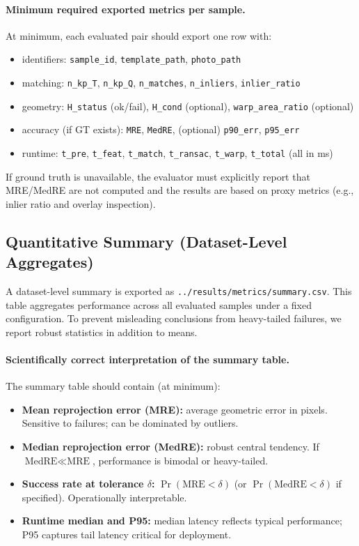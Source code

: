 \paragraph{Minimum required exported metrics per sample.}
At minimum, each evaluated pair should export one row with:
\begin{itemize}
  \item identifiers: \texttt{sample\_id}, \texttt{template\_path}, \texttt{photo\_path}
  \item matching: \texttt{n\_kp\_T}, \texttt{n\_kp\_Q}, \texttt{n\_matches}, \texttt{n\_inliers}, \texttt{inlier\_ratio}
  \item geometry: \texttt{H\_status} (ok/fail), \texttt{H\_cond} (optional), \texttt{warp\_area\_ratio} (optional)
  \item accuracy (if GT exists): \texttt{MRE}, \texttt{MedRE}, (optional) \texttt{p90\_err}, \texttt{p95\_err}
  \item runtime: \texttt{t\_pre}, \texttt{t\_feat}, \texttt{t\_match}, \texttt{t\_ransac}, \texttt{t\_warp}, \texttt{t\_total} (all in ms)
\end{itemize}
If ground truth is unavailable, the evaluator must explicitly report that MRE/MedRE are not computed and the results are based on proxy metrics (e.g., inlier ratio and overlay inspection).

\subsection{Quantitative Summary (Dataset-Level Aggregates)}
A dataset-level summary is exported as \texttt{../results/metrics/summary.csv}. This table aggregates performance across all evaluated samples under a fixed configuration. To prevent misleading conclusions from heavy-tailed failures, we report robust statistics in addition to means.


\paragraph{Scientifically correct interpretation of the summary table.}
The summary table should contain (at minimum):
\begin{itemize}
  \item \textbf{Mean reprojection error (MRE):} average geometric error in pixels. Sensitive to failures; can be dominated by outliers.
  \item \textbf{Median reprojection error (MedRE):} robust central tendency. If $\text{MedRE} \ll \text{MRE}$, performance is bimodal or heavy-tailed.
  \item \textbf{Success rate at tolerance $\delta$:} $\Pr(\text{MRE}<\delta)$ (or $\Pr(\text{MedRE}<\delta)$ if specified). Operationally interpretable.
  \item \textbf{Runtime median and P95:} median latency reflects typical performance; P95 captures tail latency critical for deployment.
\end{itemize}

